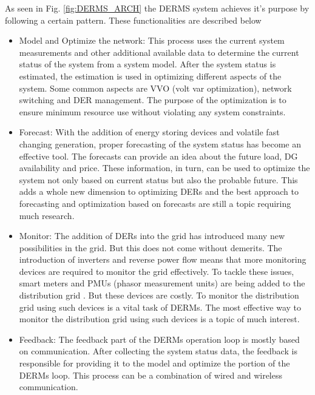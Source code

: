 As seen in Fig. \ref{fig:DERMS_ARCH} the DERMS system achieves it's purpose by following a certain pattern. These functionalities are described below

\begin{itemize}
    \item Model and Optimize the network: This process uses the current system measurements and other additional available data to determine the current status of the system from a system model. After the system status is estimated, the estimation is used in optimizing different aspects of the system. Some common aspects are VVO (volt var optimization), network switching and DER management. The purpose of the optimization is to ensure minimum resource use without violating any system constraints.
    
    \item Forecast: With the addition of energy storing devices and volatile fast changing generation, proper forecasting of the system status has become an effective tool. The forecasts can provide an idea about the future load, DG availability and price. These information, in turn, can be used to optimize the system not only based on current status but also the probable future. This adds a whole new dimension to optimizing DERs and the best approach to forecasting and optimization based on forecasts are still a topic requiring much research.
    
    \item Monitor: The addition of DERs into the grid has introduced many new possibilities in the grid. But this does not come without demerits. The introduction of inverters and reverse power flow means that more monitoring devices are required to monitor the grid effectively. To tackle these issues, smart meters and PMUs (phasor measurement units) are being added to the distribution grid \cite{DPMU1}. But these devices are costly. To monitor the distribution grid using such devices is a vital task of DERMs. The most effective way to monitor the distribution grid using such devices is a topic of much interest.
    
    \item Feedback: The feedback part of the DERMs operation loop is mostly based on communication. After collecting the system status data, the feedback is responsible for providing it to the model and optimize the portion of the DERMs loop. This process can be a combination of wired and wireless communication.
\end{itemize}

